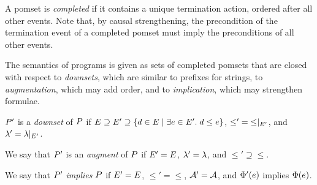 A pomset is \emph{completed} if it contains a unique termination action,
ordered after all other events.  
Note that, by causal strengthening, the precondition of the termination event
of a completed pomset must imply the preconditions of all other events.






The semantics of programs is given as sets of completed pomsets that are
closed with respect to \emph{downsets}, which are similar to prefixes for strings, to \emph{augmentation}, which may add order, and
to \emph{implication}, which may strengthen formulae.  
\begin{definition}
  \label{def:downset}
  $P'$ is a \emph{downset} of $P$ if
  $E \supseteq E' \supseteq \{ d \in E \mid
  \exists e\in E'.\; d\le e\}$, ${\le'}={\le}\mathbin{|}_{E'}$,
  and ${\lambda'}={\lambda}\mathbin{|}_{E'}$.
  
  
  
  We say that
  $P'$ is an \emph{augment} of $P$ if $E'=E$,
  ${\lambda'}={\lambda}$, and ${\le'}\supseteq{\le}$. 
  
  We say that
  $P'$ \emph{implies} $P$ if $E'=E$, ${\le'}={\le}$,
  $\mathcal{A}'=\mathcal{A}$, and $\Phi'(e)$
  implies $\Phi(e)$. 
\end{definition}
 
